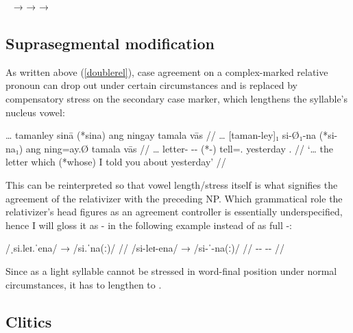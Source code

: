 \pex~\label{ex:adjredup}
	\a {}
		→ 
	\a {}
		→ 
	\a {}
		→ 
\xe


\subsection{Suprasegmental modification}

As written above (\autoref{doublerel}), case agreement on a complex-marked 
relative pronoun can drop out under certain 
circumstances and is replaced by compensatory stress on the secondary case 
marker, which lengthens the syllable's nucleus vowel:

\ex\begingl
	\gla … tamanley sinā (*sina) ang ningay tamala vās //
	\glb … [taman-ley]₁ si-Ø₁-na (*si-na₁) ang ning=ay.Ø tamala vās //
	\glc … letter-\PargI{} \Rel{}-\PatTI{}-\Gen{} (*\Rel{}-\Gen{}) \AgtT{} 
		tell=\Fsg{}.\Top{} yesterday \Ssg{}.\Parg{} //
	\glft `… the letter which (*whose) I told you about yesterday' //
\endgl\xe

This can be reinterpreted so that vowel length/stress itself is what signifies 
the agreement of the relativizer with the preceding NP. Which grammatical role 
the relativizer's head figures as an agreement controller is essentially 
underspecified, hence I will gloss it as -\Agr{} in the following example 
instead of as full -\PargI{}:

\ex[everygla=\upshape]\begingl
	\gla /ˌsi.leɪ.ˈena/ → /si.ˈna(ː)/ //
	\glb /si-leɪ-ena/ → /si-ˈ-na(ː)/ //
	\glc \Rel{}-\PargI{}-\Gen{} {} \Rel{}-\Agr{}-\Gen{} //
\endgl\xe

Since  as a light syllable cannot be stressed in word-final 
position under normal circumstances, it has to lengthen to .


\subsection{Clitics}
\label{subsec:clitics}

